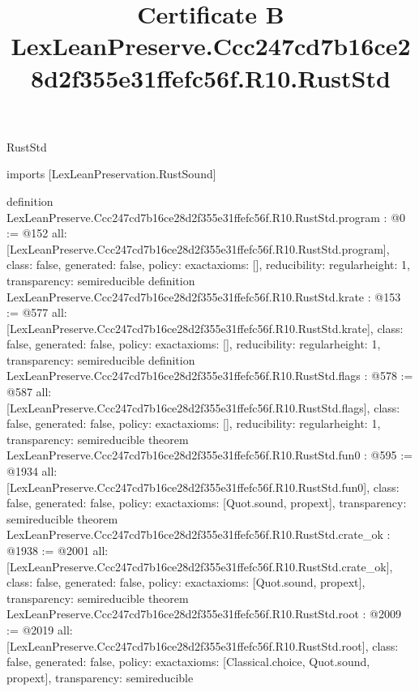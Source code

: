 \begin{lexlean}{RustStd}
\title{Certificate B LexLeanPreserve.Ccc247cd7b16ce28d2f355e31ffefc56f.R10.RustStd}
\begin{coremodule}
imports [LexLeanPreservation.RustSound]

definition LexLeanPreserve.Ccc247cd7b16ce28d2f355e31ffefc56f.R10.RustStd.program : @0 := @152 {
  all: [LexLeanPreserve.Ccc247cd7b16ce28d2f355e31ffefc56f.R10.RustStd.program],
  class: false,
  generated: false,
  policy: exact{axioms: []},
  reducibility: regular{height: 1},
  transparency: semireducible
}
definition LexLeanPreserve.Ccc247cd7b16ce28d2f355e31ffefc56f.R10.RustStd.krate : @153 := @577 {
  all: [LexLeanPreserve.Ccc247cd7b16ce28d2f355e31ffefc56f.R10.RustStd.krate],
  class: false,
  generated: false,
  policy: exact{axioms: []},
  reducibility: regular{height: 1},
  transparency: semireducible
}
definition LexLeanPreserve.Ccc247cd7b16ce28d2f355e31ffefc56f.R10.RustStd.flags : @578 := @587 {
  all: [LexLeanPreserve.Ccc247cd7b16ce28d2f355e31ffefc56f.R10.RustStd.flags],
  class: false,
  generated: false,
  policy: exact{axioms: []},
  reducibility: regular{height: 1},
  transparency: semireducible
}
theorem LexLeanPreserve.Ccc247cd7b16ce28d2f355e31ffefc56f.R10.RustStd.fun0 : @595 := @1934 {
  all: [LexLeanPreserve.Ccc247cd7b16ce28d2f355e31ffefc56f.R10.RustStd.fun0],
  class: false,
  generated: false,
  policy: exact{axioms: [Quot.sound, propext]},
  transparency: semireducible
}
theorem LexLeanPreserve.Ccc247cd7b16ce28d2f355e31ffefc56f.R10.RustStd.crate_ok : @1938 := @2001 {
  all: [LexLeanPreserve.Ccc247cd7b16ce28d2f355e31ffefc56f.R10.RustStd.crate_ok],
  class: false,
  generated: false,
  policy: exact{axioms: [Quot.sound, propext]},
  transparency: semireducible
}
theorem LexLeanPreserve.Ccc247cd7b16ce28d2f355e31ffefc56f.R10.RustStd.root : @2009 := @2019 {
  all: [LexLeanPreserve.Ccc247cd7b16ce28d2f355e31ffefc56f.R10.RustStd.root],
  class: false,
  generated: false,
  policy: exact{axioms: [Classical.choice, Quot.sound, propext]},
  transparency: semireducible
}


\end{coremodule}
\end{lexlean}
